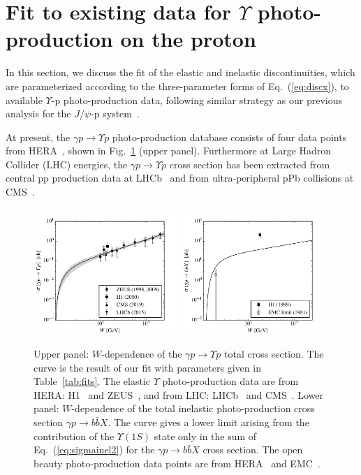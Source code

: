\documentclass[prd,amsmath,twocolumn,floatfix,amssymb, preprintnumbers, linenumbers,nofootinbib, superscriptaddress]{revtex4}
\begin{document}
\section{Fit to existing data for $\Upsilon$ photo-production on the proton}


In this section, we discuss the fit of the elastic and inelastic discontinuities, which are parameterized according to the three-parameter forms of Eq.~(\ref{eq:discx}), to available  $\Upsilon$-p photo-production data, following similar strategy as our previous analysis for 
the $J/\psi$-p system~\cite{Gryniuk:2016mpk}. 
 
At present, the $\gamma p \to \Upsilon p$ photo-production database consists of four data points from HERA~\cite{Adloff:2000vm,Breitweg:1998ki,Chekanov:2009zz}, shown in Fig.~\ref{fig:sigmatot} 
(upper panel). 
Furthermore at Large Hadron Collider (LHC) energies, the $\gamma p \to \Upsilon p$ cross section has been extracted from central pp production data at LHCb~\cite{Aaij:2015kea} 
and from ultra-peripheral pPb collisions at  CMS~\cite{Sirunyan:2018sav}.

\begin{figure}[h]
\includegraphics[width=0.49\textwidth]{si_y.pdf}
\includegraphics[width=0.49\textwidth]{si_bbX.pdf}
\caption{Upper panel: $W$-dependence of the $\gamma p \to \Upsilon p$ total cross section.
The curve is the result of our fit with parameters given in Table~\ref{tab:fits}.
The elastic $\Upsilon$ photo-production data are from HERA: H1~\cite{Adloff:2000vm}
and ZEUS~\cite{Breitweg:1998ki, Chekanov:2009zz}, and from LHC: LHCb~\cite{Aaij:2015kea} 
and CMS~\cite{Sirunyan:2018sav}. 
Lower panel: $W$-dependence of the 
total inelastic photo-production cross section $\gamma p \to b \bar b X$.
The curve gives a lower limit arising from the contribution of the $\Upsilon(1S)$ state only in the sum of Eq.~(\ref{eq:sigmainel2}) for the $\gamma p \to b \bar b X$ cross section. 
The open beauty photo-production data points are from HERA~\cite{Adloff:1999nr} and EMC~\cite{Aubert:1981gx}.}
\label{fig:sigmatot}
\end{figure}
\end{document}
